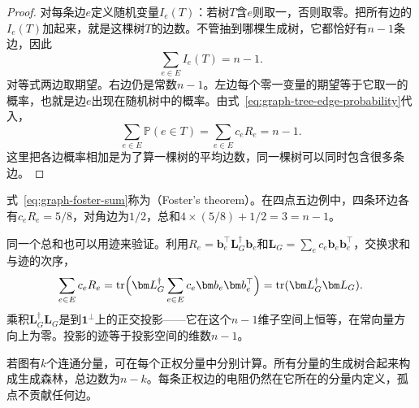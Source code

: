 \begin{proof}
对每条边$e$定义随机变量$I_e(T)$：若树$T$含$e$则取一，否则取零。把所有边的$I_e(T)$加起来，就是这棵树$T$的边数。不管抽到哪棵生成树，它都恰好有$n-1$条边，因此
\[
\sum_{e\in E} I_e(T)=n-1.
\]
对等式两边取期望。右边仍是常数$n-1$。左边每个零一变量的期望等于它取一的概率，也就是边$e$出现在随机树中的概率。由式~\eqref{eq:graph-tree-edge-probability}代入，
\[
\sum_{e\in E}\mathbb P(e\in T)
=\sum_{e\in E}c_eR_e=n-1.
\]
这里把各边概率相加是为了算一棵树的平均边数，同一棵树可以同时包含很多条边。
\end{proof}

式~\eqref{eq:graph-foster-sum}称为（Foster's theorem）。在四点五边例中，四条环边各有$c_eR_e=5/8$，对角边为$1/2$，总和$4\times(5/8)+1/2=3=n-1$。

同一个总和也可以用迹来验证。利用$R_e=\bm b_e^\top\bm L_G^\dagger\bm b_e$和$\bm L_G=\sum_e c_e\bm b_e\bm b_e^\top$，交换求和与迹的次序，
\[
\sum_{e\in E}c_eR_e
=\operatorname{tr}\Bigl(\bm L_G^\dagger
   \sum_{e\in E}c_e\bm b_e\bm b_e^\top\Bigr)
=\operatorname{tr}(\bm L_G^\dagger\bm L_G).
\]
乘积$\bm L_G^\dagger\bm L_G$是到$\bm 1^\perp$上的正交投影——它在这个$n-1$维子空间上恒等，在常向量方向上为零。投影的迹等于投影空间的维数$n-1$。

若图有$k$个连通分量，可在每个正权分量中分别计算。所有分量的生成树合起来构成生成森林，总边数为$n-k$。每条正权边的电阻仍然在它所在的分量内定义，孤点不贡献任何边。
